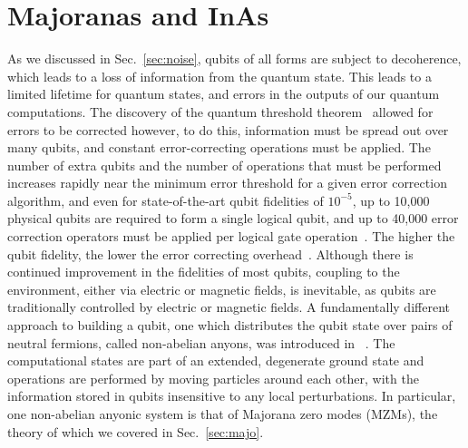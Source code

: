 \chapter{Majoranas and InAs}
\label{sec:majoinas}

As we discussed in Sec.~\ref{sec:noise}, qubits of all forms are subject to decoherence, which leads to a loss of information
from the quantum state. This leads to a limited lifetime for quantum states, and errors in the outputs of our quantum computations.
The discovery of the quantum threshold theorem~\cite{1996quant.ph.11025A,doi:10.1098/rspa.1998.0167} allowed for errors to be corrected
however, to do this, information must be spread out over many qubits, and constant error-correcting operations must be applied.
The number of extra qubits and the number of operations that must be performed increases rapidly near the minimum error threshold for
a given error correction algorithm, and even for state-of-the-art qubit fidelities of $10^{-5}$, up to 10,000 physical qubits are required
to form a single logical qubit, and up to 40,000 error correction operators must be applied per logical gate operation~\cite{6657074}.
The higher the qubit fidelity, the lower the error correcting overhead~\cite{nature23460}. Although there is continued improvement in the fidelities
of most qubits, coupling to the environment, either via electric or magnetic fields, is inevitable, as qubits are traditionally controlled
by electric or magnetic fields. A fundamentally different approach to building a qubit, one which distributes the qubit state over pairs of
neutral fermions, called non-abelian anyons, was introduced in ~\cite{RevModPhys.80.1083}. The computational states are part of an extended,
degenerate ground state and operations are performed by moving particles around each other, with the information stored in qubits insensitive
to any local perturbations. In particular, one non-abelian anyonic system is that of Majorana zero modes (MZMs), the theory of which we covered in
Sec.~\ref{sec:majo}.

